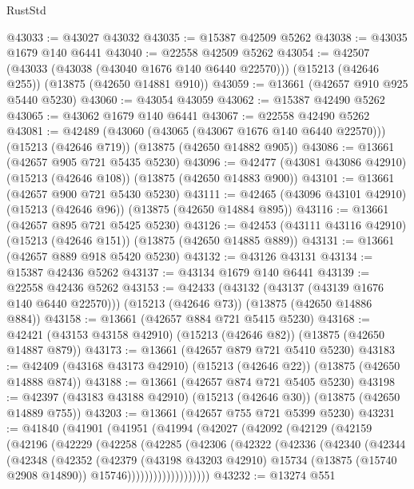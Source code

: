 \begin{lexlean}{RustStd}
\begin{coremodule}
@43033 := @43027 @43032
@43035 := @15387 @42509 @5262
@43038 := @43035 @1679 @140 @6441
@43040 := @22558 @42509 @5262
@43054 := @42507
    (@43033 (@43038 (@43040 @1676 @140 @6440 @22570)))
    (@15213 (@42646 @255))
    (@13875 (@42650 @14881 @910))
@43059 := @13661 (@42657 @910 @925 @5440 @5230)
@43060 := @43054 @43059
@43062 := @15387 @42490 @5262
@43065 := @43062 @1679 @140 @6441
@43067 := @22558 @42490 @5262
@43081 := @42489
    (@43060 (@43065 (@43067 @1676 @140 @6440 @22570)))
    (@15213 (@42646 @719))
    (@13875 (@42650 @14882 @905))
@43086 := @13661 (@42657 @905 @721 @5435 @5230)
@43096 := @42477 (@43081 @43086 @42910) (@15213 (@42646 @108)) (@13875 (@42650 @14883 @900))
@43101 := @13661 (@42657 @900 @721 @5430 @5230)
@43111 := @42465 (@43096 @43101 @42910) (@15213 (@42646 @96)) (@13875 (@42650 @14884 @895))
@43116 := @13661 (@42657 @895 @721 @5425 @5230)
@43126 := @42453 (@43111 @43116 @42910) (@15213 (@42646 @151)) (@13875 (@42650 @14885 @889))
@43131 := @13661 (@42657 @889 @918 @5420 @5230)
@43132 := @43126 @43131
@43134 := @15387 @42436 @5262
@43137 := @43134 @1679 @140 @6441
@43139 := @22558 @42436 @5262
@43153 := @42433
    (@43132 (@43137 (@43139 @1676 @140 @6440 @22570)))
    (@15213 (@42646 @73))
    (@13875 (@42650 @14886 @884))
@43158 := @13661 (@42657 @884 @721 @5415 @5230)
@43168 := @42421 (@43153 @43158 @42910) (@15213 (@42646 @82)) (@13875 (@42650 @14887 @879))
@43173 := @13661 (@42657 @879 @721 @5410 @5230)
@43183 := @42409 (@43168 @43173 @42910) (@15213 (@42646 @22)) (@13875 (@42650 @14888 @874))
@43188 := @13661 (@42657 @874 @721 @5405 @5230)
@43198 := @42397 (@43183 @43188 @42910) (@15213 (@42646 @30)) (@13875 (@42650 @14889 @755))
@43203 := @13661 (@42657 @755 @721 @5399 @5230)
@43231 := @41840
    (@41901
      (@41951
        (@41994
          (@42027
            (@42092
              (@42129
                (@42159
                  (@42196
                    (@42229
                      (@42258
                        (@42285
                          (@42306
                            (@42322
                              (@42336
                                (@42340
                                  (@42344
                                    (@42348
                                      (@42352
                                        (@42379
                                          (@43198 @43203 @42910)
                                          @15734
                                          (@13875 (@15740 @2908 @14890))
                                          @15746)))))))))))))))))))
@43232 := @13274 @551

\end{coremodule}
\end{lexlean}
